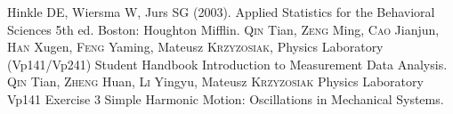 \begin{thebibliography}{99}
     Hinkle DE, Wiersma W, Jurs SG (2003). Applied Statistics for the Behavioral Sciences 5th ed. Boston: Houghton Mifflin.
     \textsc{Qin} Tian, \textsc{Zeng} Ming, \textsc{Cao} Jianjun, \textsc{Han} Xugen, \textsc{Feng} Yaming, Mateusz \textsc{Krzyzosiak}, Physics Laboratory (Vp141/Vp241) Student Handbook Introduction to Measurement Data Analysis.
     \textsc{Qin} Tian, \textsc{Zheng} Huan, \textsc{Li} Yingyu, Mateusz \textsc{Krzyzosiak} Physics Laboratory Vp141 Exercise 3 Simple Harmonic Motion: Oscillations in Mechanical Systems.
\end{thebibliography}